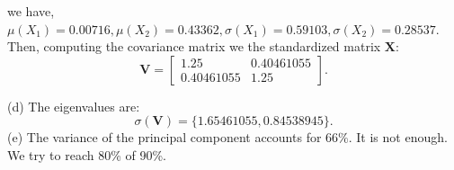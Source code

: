 we have, $\mu(X_1) = 0.00716, \mu(X_2) = 0.43362, \sigma(X_1) = 0.59103, \sigma(X_2) = 0.28537$. Then, computing the covariance matrix we the standardized matrix $\mathbf{X}$:
\[ \boxed{\mathbf{V} = 
\begin{bmatrix}
    1.25 & 0.40461055 \\
    0.40461055 & 1.25
\end{bmatrix}.}
\]

(d) The eigenvalues are:
\[\boxed{
    \sigma(\mathbf{V}) = \{1.65461055, 0.84538945\}.}
\]
(e) The variance of the principal component accounts for $\boxed{66\%}$. It is not enough. We try to reach 80\% of 90\%.
